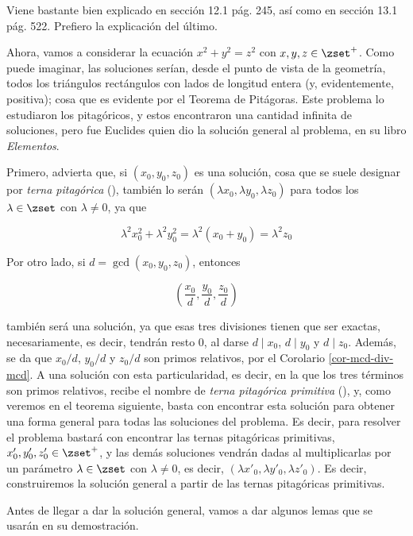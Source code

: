 



Viene bastante bien explicado en \cite{burton} sección 12.1
pág. 245, así como en \cite{rosen} sección 13.1 pág. 522.
Prefiero la explicación del último.

Ahora, vamos a considerar la ecuación $x^2 + y^2 = z^2$ con $x, y, z \in
\zset^{+}$. Como puede imaginar, las soluciones serían, desde el punto de
vista de la geometría, todos los triángulos rectángulos con lados de
longitud entera (y, evidentemente, positiva); cosa que es evidente por el
Teorema de Pitágoras. Este problema lo estudiaron los pitagóricos, y estos
encontraron una cantidad infinita de soluciones, pero fue Euclides quien dio
la solución general al problema, en su libro \emph{Elementos}.

Primero, advierta que, si $(x_0, y_0, z_0)$ es una solución, cosa que se
suele designar por \emph{terna pitagórica} (), también
lo serán $(\lambda x_0, \lambda y_0, \lambda z_0)$ para todos los $\lambda
\in \zset$ con $\lambda \neq 0$, ya que

$$ \lambda^2 x_0^2 + \lambda^2 y_0^2 = \lambda^2(x_0 + y_0) = \lambda^2 z_0
$$

Por otro lado, si $d = \gcd(x_0, y_0, z_0)$, entonces

$$ \left( \frac{x_0}{d}, \frac{y_0}{d}, \frac{z_0}{d} \right) $$

\noindent también será una solución, ya que esas tres divisiones tienen que
ser exactas, necesariamente, es decir, tendrán resto 0, al darse $d \mid
x_0$, $d \mid y_0$ y $d \mid z_0$. Además, se da que $x_0/d$, $y_0/d$ y
$z_0/d$ son primos relativos, por el Corolario \ref{cor-mcd-div-mcd}. A una
solución con esta particularidad, es decir, en la que los tres términos son
primos relativos, recibe el nombre de \emph{terna pitagórica primitiva}
(), y, como veremos en el teorema
siguiente, basta con encontrar esta solución para obtener una forma general
para todas las soluciones del problema. Es decir, para resolver el problema
bastará con encontrar las ternas pitagóricas primitivas, $x'_0, y'_0, z'_0
\in \zset^{+}$, y las demás soluciones vendrán dadas al multiplicarlas por
un parámetro $\lambda \in \zset$ con $\lambda \neq 0$, es decir, $(\lambda
x'_0, \lambda y'_0, \lambda z'_0)$. Es decir, construiremos la solución
general a partir de las ternas pitagóricas primitivas.

Antes de llegar a dar la solución general, vamos a dar algunos lemas que se
usarán en su demostración.

